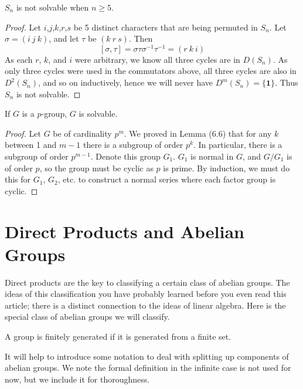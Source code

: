 \begin{theorem}
    $S_n$ is not solvable when $n \geq 5$.
\end{theorem}
\begin{proof}
    Let $i$,$j$,$k$,$r$,$s$ be 5 distinct characters that are being permuted in $S_n$. Let $\sigma = (i\ j\ k)$, and let $\tau$ be $(k\ r\ s)$. Then
    \[ [\sigma, \tau] = \sigma\tau\sigma^{-1}\tau^{-1} = (r\ k\ i) \]
    As each $r$, $k$, and $i$ were arbitrary, we know all three cycles are in $D(S_n)$. As only three cycles were used in the commutators above, all three cycles are also in $D^2(S_n)$, and so on inductively, hence we will never have $D^m(S_n) = \{ \mathbf{1} \}$. Thus $S_n$ is not solvable.
\end{proof}

\begin{theorem}
    If $G$ is a $p$-group, $G$ is solvable.
\end{theorem}
\begin{proof}
    Let $G$ be of cardinality $p^m$. We proved in Lemma (6.6) that for any $k$ between 1 and $m-1$ there is a subgroup of order $p^k$. In particular, there is a subgroup of order $p^{m-1}$. Denote this group $G_1$. $G_1$ is normal in $G$, and $G/G_1$ is of order $p$, so the group must be cyclic as $p$ is prime. By induction, we must do this for $G_1$, $G_2$, etc. to construct a normal series where each factor group is cyclic.
\end{proof}

















\chapter{Direct Products and Abelian Groups}

Direct products are the key to classifying a certain class of abelian groups. The ideas of this classification you have probably learned before you even read this article; there is a distinct connection to the ideas of linear algebra. Here is the special class of abelian groups we will classify.

A group is finitely generated if it is generated from a finite set.

It will help to introduce some notation to deal with splitting up components of abelian groups. We note the formal definition in the infinite case is not used for now, but we include it for thoroughness.

